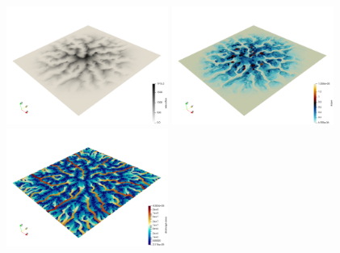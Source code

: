 \begin{center}
\includegraphics[width=5.3cm]{python_codes/fieldstone_140/results/exp4/elevation}
\includegraphics[width=5.3cm]{python_codes/fieldstone_140/results/exp4/slope}
\includegraphics[width=5.3cm]{python_codes/fieldstone_140/results/exp4/drainage}
\end{center}







